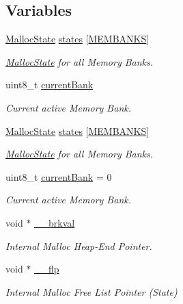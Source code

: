 \subsection*{Variables}
\begin{DoxyCompactItemize}
\item 
\hyperlink{struct_malloc_state}{Malloc\-State} \hyperlink{group__xmem_gabe6eb8575dfb63d41e3ca7fe774d1b27}{states} \mbox{[}\hyperlink{group__xmem_ga1ed280cb3dd0a4a03aeda6aaccc180d3}{M\-E\-M\-B\-A\-N\-K\-S}\mbox{]}
\begin{DoxyCompactList}\small\item\em \hyperlink{struct_malloc_state}{Malloc\-State} for all Memory Banks. \end{DoxyCompactList}\item 
uint8\-\_\-t \hyperlink{group__xmem_ga4a1acf2db179d35f089bd00881d1c2eb}{current\-Bank}
\begin{DoxyCompactList}\small\item\em Current active Memory Bank. \end{DoxyCompactList}\item 
\hyperlink{struct_malloc_state}{Malloc\-State} \hyperlink{group__xmem_gabe6eb8575dfb63d41e3ca7fe774d1b27}{states} \mbox{[}\hyperlink{group__xmem_ga1ed280cb3dd0a4a03aeda6aaccc180d3}{M\-E\-M\-B\-A\-N\-K\-S}\mbox{]}
\begin{DoxyCompactList}\small\item\em \hyperlink{struct_malloc_state}{Malloc\-State} for all Memory Banks. \end{DoxyCompactList}\item 
uint8\-\_\-t \hyperlink{group__xmem_ga4a1acf2db179d35f089bd00881d1c2eb}{current\-Bank} = 0
\begin{DoxyCompactList}\small\item\em Current active Memory Bank. \end{DoxyCompactList}\item 
void $\ast$ \hyperlink{group__xmem_ga8d18204366e8a385c441663ed41f1ae4}{\-\_\-\-\_\-brkval}
\begin{DoxyCompactList}\small\item\em Internal Malloc Heap-\/\-End Pointer. \end{DoxyCompactList}\item 
void $\ast$ \hyperlink{group__xmem_gadc2de04ee0c18717273d0ab52fd6dc1b}{\-\_\-\-\_\-flp}
\begin{DoxyCompactList}\small\item\em Internal Malloc Free List Pointer (State) \end{DoxyCompactList}\end{DoxyCompactItemize}


